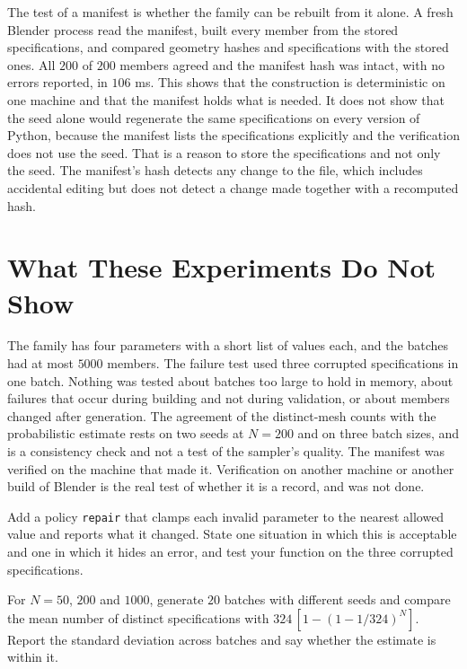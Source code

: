 The test of a manifest is whether the family can be rebuilt from it alone. A fresh Blender process read the manifest, built every member from the stored specifications, and compared geometry hashes and specifications with the stored ones. All $200$ of $200$ members agreed and the manifest hash was intact, with no errors reported, in $106$ ms. This shows that the construction is deterministic on one machine and that the manifest holds what is needed. It does not show that the seed alone would regenerate the same specifications on every version of Python, because the manifest lists the specifications explicitly and the verification does not use the seed. That is a reason to store the specifications and not only the seed. The manifest's hash detects any change to the file, which includes accidental editing but does not detect a change made together with a recomputed hash.

\section{What These Experiments Do Not Show}

The family has four parameters with a short list of values each, and the batches had at most $5000$ members. The failure test used three corrupted specifications in one batch. Nothing was tested about batches too large to hold in memory, about failures that occur during building and not during validation, or about members changed after generation. The agreement of the distinct-mesh counts with the probabilistic estimate rests on two seeds at $N=200$ and on three batch sizes, and is a consistency check and not a test of the sampler's quality. The manifest was verified on the machine that made it. Verification on another machine or another build of Blender is the real test of whether it is a record, and was not done.

\begin{exercise}
Add a policy \texttt{repair} that clamps each invalid parameter to the nearest allowed value and reports what it changed. State one situation in which this is acceptable and one in which it hides an error, and test your function on the three corrupted specifications.
\end{exercise}

\begin{exercise}
For $N=50$, $200$ and $1000$, generate $20$ batches with different seeds and compare the mean number of distinct specifications with $324\,[1-(1-1/324)^N]$. Report the standard deviation across batches and say whether the estimate is within it.
\end{exercise}

